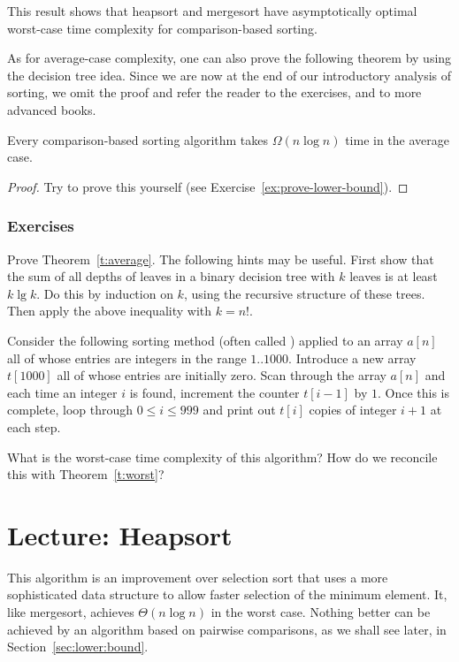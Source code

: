 This result shows that heapsort and mergesort have asymptotically optimal 
worst-case time complexity for comparison-based sorting.

As for average-case complexity, one can also prove the following
theorem by using the decision tree idea. Since we are now at the end of
our introductory analysis of sorting, we omit the proof and refer the
reader to the exercises, and to more advanced books.

\begin{Theorem}\label{t:average}
Every comparison-based sorting algorithm takes $\Omega(n \log n)$ time
in the average case. 
\end{Theorem}

\begin{proof}
Try to prove this yourself (see Exercise~\ref{ex:prove-lower-bound}).
\end{proof}
\subsection*{Exercises}

\begin{Exercise} \label{ex:prove-lower-bound} 
Prove Theorem~\ref{t:average}. The following hints may be useful. First
show that the sum of all depths of leaves in a binary decision tree with $k$
leaves is at least $k \lg k$. Do this by  induction on $k$, using the
recursive structure of these trees. Then apply the above inequality 
with $k=n!$.
\end{Exercise}

\begin{Exercise}
\label{ex:radix}
Consider the following sorting method (often called ) 
applied to an array $a[n]$ all of whose entries are integers in the range 
$1..1000$. Introduce a new array $t[1000]$ all of whose entries are initially 
zero. Scan through the array $a[n]$ and each time an integer $i$ is found, 
increment the counter $t[i-1]$ by $1$. Once this is complete, loop through 
$0 \leq i\leq 999$ and print out $t[i]$ copies of integer $i+1$ at each step.

What is the worst-case time complexity of this algorithm? How do we reconcile 
this with Theorem~\ref{t:worst}?
\end{Exercise}

\chapter{Lecture: Heapsort} \label{sec:heapsort}
This algorithm is an improvement over selection sort that uses a more 
sophisticated data structure to allow faster selection of the minimum element. 
It, like mergesort, achieves $\Theta(n \log n)$ in the worst case. Nothing 
better can be achieved by an algorithm based on pairwise comparisons, as we 
shall see later, in Section~\ref{sec:lower:bound}.

